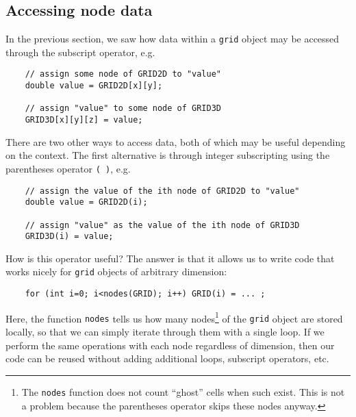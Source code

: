 \subsection{Accessing node data}
In the previous section, we saw how data within a {\tt grid} object may be accessed through the subscript operator, e.g.
\begin{shadebox}
\begin{verbatim}
    // assign some node of GRID2D to "value"
    double value = GRID2D[x][y];

    // assign "value" to some node of GRID3D 
    GRID3D[x][y][z] = value;
\end{verbatim}
\end{shadebox}
There are two other ways to access data, both of which may be useful depending on the context.  The first alternative is through integer subscripting using the parentheses operator {\tt ( )}, e.g.
\begin{shadebox}
\begin{verbatim}
    // assign the value of the ith node of GRID2D to "value"
    double value = GRID2D(i);

    // assign "value" as the value of the ith node of GRID3D
    GRID3D(i) = value;
\end{verbatim}
\end{shadebox}
How is this operator useful?  The answer is that it allows us to write code that works nicely for {\tt grid} objects of arbitrary dimension:
\begin{shadebox}
\begin{verbatim}
    for (int i=0; i<nodes(GRID); i++) GRID(i) = ... ;
\end{verbatim}
\end{shadebox}
Here, the function {\tt nodes} tells us how many nodes\footnote{The {\tt nodes} function does not count ``ghost'' cells when such exist.  This is not a problem because the parentheses operator skips these nodes anyway.} of the {\tt grid} object are stored locally, so that we can simply iterate through them with a single loop.  If we perform the same operations with each node regardless of dimension, then our code can be reused without adding additional loops, subscript operators, etc.

